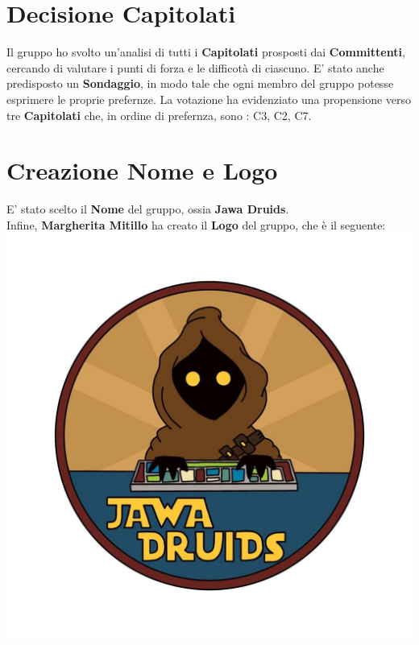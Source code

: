 	\chapter{Decisione Capitolati}
	Il gruppo ho svolto un'analisi di tutti i \textbf{Capitolati} prosposti dai \textbf{Committenti}, cercando di valutare i punti di forza e le difficotà di ciascuno. 
	E' stato anche predisposto un \textbf{Sondaggio}, in modo tale che ogni membro del gruppo potesse esprimere le proprie prefernze. 
	La votazione ha evidenziato una propensione verso tre \textbf{Capitolati} che, in ordine di prefernza, sono : C3, C2, C7.
	 
	\chapter{Creazione Nome e Logo}
	E' stato scelto il \textbf{Nome} del gruppo, ossia \textbf{Jawa Druids}. \\
	Infine, \textbf{Margherita Mitillo} ha creato il  \textbf{Logo} del gruppo, che è il seguente:\\
	\includegraphics[width=0.5\linewidth]{../../immagini/DRUIDSLOGO.jpg}\\[4ex]
